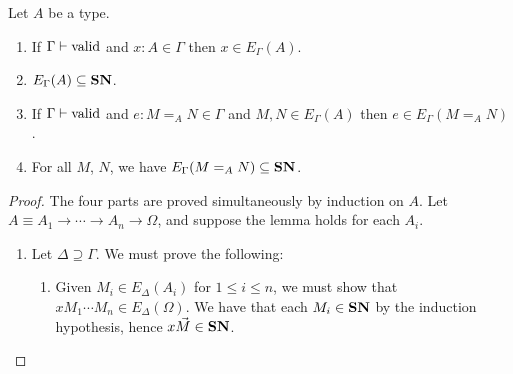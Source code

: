 \begin{lemma}
\label{lm:varcompute2}
Let $A$ be a type.
\begin{enumerate}
\item
If $\Gamma \vdash \mathrm{valid}$ and $x : A \in \Gamma$ then $x \in E_\Gamma(A)$.
\item
$E_\Gamma(A) \subseteq \mathbf{SN}$.
\item
If $\Gamma \vdash \mathrm{valid}$ and $e : M =_A N \in \Gamma$ and $M, N \in E_\Gamma(A)$ then $e \in E_\Gamma(M =_A N)$.
\item
For all $M$, $N$, we have $E_\Gamma(M =_A N) \subseteq \mathbf{SN}$.
\end{enumerate}
\end{lemma}

\begin{proof}
The four parts are proved simultaneously by induction on $A$.  Let $A \equiv A_1 \rightarrow \cdots \rightarrow A_n \rightarrow \Omega$,
and suppose the lemma holds for each $A_i$.
\begin{enumerate}
\item
Let $\Delta \supseteq \Gamma$.  We must prove the following:
\begin{enumerate}
\item
Given $M_i \in E_\Delta(A_i)$ for $1 \leq i \leq n$, we must show that $x M_1 \cdots M_n \in E_\Delta(\Omega)$.  We have that
each $M_i \in \mathbf{SN}$ by the induction hypothesis, hence $x \vec{M} \in \mathbf{SN}$.


\end{enumerate}
\end{enumerate}
\end{proof}
